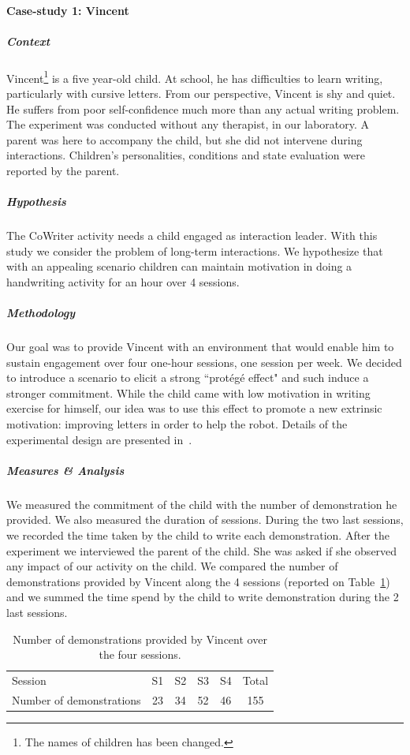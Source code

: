 \documentclass[10pt,a4paper]{article}
\begin{document}
\paragraph{Case-study 1: Vincent}
\subparagraph{Context}
Vincent\footnote{The names of children has been changed.} is a five year-old child. At school, he has difficulties to learn writing, particularly with cursive letters. From our perspective, Vincent is shy and quiet. He suffers from poor self-confidence much more than any actual writing problem. The experiment was conducted without any therapist, in our laboratory. A parent was here to accompany the child, but she did not intervene during interactions. Children's personalities, conditions and state evaluation were reported by the parent.
\subparagraph{Hypothesis}
The CoWriter activity needs a child engaged as interaction leader. 
With this study we consider the problem of long-term interactions. We hypothesize that with an appealing scenario children can maintain motivation in doing a handwriting activity for an hour over 4 sessions.
\subparagraph{Methodology}
Our goal was to provide Vincent with
an environment that would enable him to sustain engagement over four one-hour sessions, 
one session per week. We decided to introduce a scenario to elicit a strong ``prot\'eg\'e effect" and such induce a stronger commitment. While the child came with low motivation in writing exercise for himself, our idea was to use this effect to promote a new extrinsic motivation: improving letters in order to help the robot. Details of the experimental design are presented in~\cite{jacq2016building}.
\subparagraph{Measures \& Analysis}
We measured the commitment of the child with the number of demonstration he provided. We also measured the duration of sessions. During the two last sessions, we recorded the time taken by the child to write each demonstration. After the experiment we interviewed the parent of the child. She was asked if she observed any impact of our activity on the child.
We compared the number of demonstrations provided by Vincent along the 4 sessions (reported on Table~\ref{table:vincent_sess}) and we summed the time spend by the child to write demonstration during the 2 last sessions.
\begin{table}[!]
    \centering
    \caption{\footnotesize Number of demonstrations provided by Vincent over the four sessions.}
    \begin{tabular}{lccccc}
        \toprule
        Session & S1 & S2 & S3 & S4 & Total\\ 
        Number of demonstrations & 23 & 34 & 52 & 46 & 155\\ 
        \bottomrule

    \end{tabular}
    \label{table:vincent_sess}
\end{table}
\end{document}
